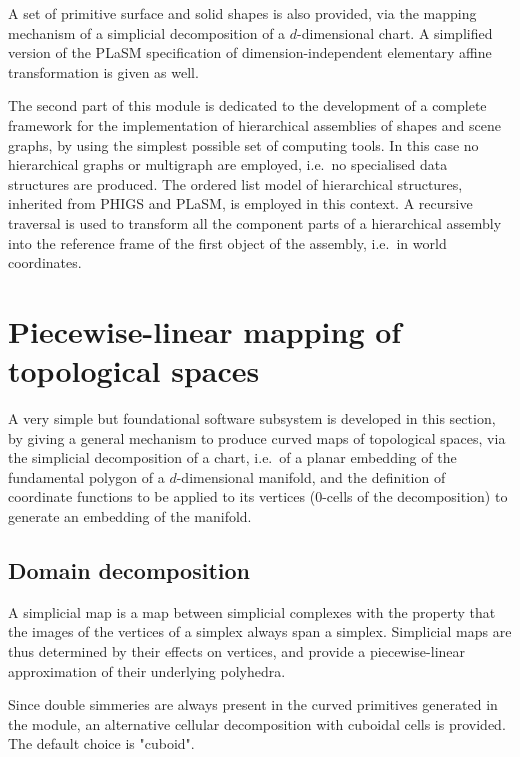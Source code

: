 \documentclass[11pt,oneside]{article}	%
\begin{document}
A set of primitive surface and solid shapes is also provided, via the mapping mechanism of a simplicial decomposition of a $d$-dimensional chart. A simplified version of the PLaSM specification of dimension-independent elementary affine transformation is given as well.

The second part of this module is dedicated to the development of a complete framework for the implementation of hierarchical assemblies of shapes and scene graphs, by using the simplest possible set of computing tools. In this case no hierarchical graphs or multigraph are employed, i.e.~no specialised data structures are produced. The ordered list model of hierarchical structures, inherited from PHIGS and PLaSM, is employed in this context. A recursive traversal is used to transform all the component parts of a hierarchical assembly into the reference frame of the first object of the assembly, i.e.~in world coordinates.

\section{Piecewise-linear mapping of topological spaces}

A very simple but foundational software subsystem is developed in this section, by giving a general mechanism to produce curved maps of topological spaces, via the simplicial decomposition of a chart, i.e.~of a planar embedding of the fundamental polygon of a $d$-dimensional manifold, and the definition of coordinate functions to be applied to its vertices ($0$-cells of the decomposition) to generate an embedding of the manifold.

\subsection{Domain decomposition}

A simplicial map is a map between simplicial complexes with the property that the images of the vertices of a simplex always span a simplex.  Simplicial maps are thus determined by their effects on vertices, and provide a piecewise-linear approximation of their underlying polyhedra. 

Since double simmeries are always present in the curved primitives generated in the module, an alternative cellular decomposition with cuboidal cells is provided.  The default choice is "cuboid".
\end{document}
